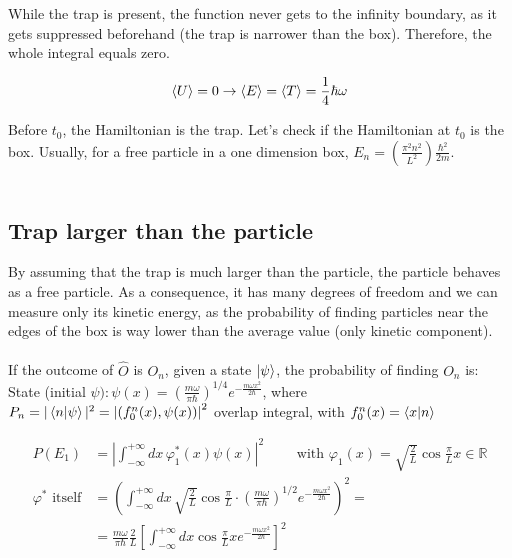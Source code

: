 \noindent
While the trap is present, the function never gets to the infinity boundary, as it gets suppressed beforehand (the trap is narrower than the box).
Therefore, the whole integral equals zero.

$$\expval{U}=0 \rightarrow \expval{E}=\expval{T}=\frac{1}{4} \hbar \omega $$

\noindent
Before $t_0$, the Hamiltonian is the trap.
Let's check if the Hamiltonian at $t_0$ is the box.
Usually, for a free particle in a one dimension box,  $E_n=\left(\frac{\pi^{2}n^2}{L^2}\right)\frac{\hbar^{2}}{2 m}$.\\
\\

	\subsection{Trap larger than the particle}
	By assuming that the trap is much larger than the particle, the particle behaves as a free particle.
	As a consequence, it has many degrees of freedom and we can measure only its kinetic energy, as the probability of finding particles near the edges of the box is way lower than the average value (only kinetic component).\\
	\\
	\noindent
	If the outcome of $\hat{O}$ is $O_n$, given a state $\ket{\psi}$, the probability of finding $O_n$ is:
	\\
	State (initial $\psi): \psi(x)=\left(\frac{m \omega}{ \pi \hbar}\right)^{1 / 4} e^{-\frac{m \omega x^{2}}{2 \hbar}}$, where $P_{n}=|\bra{n} \ket{\psi}|^{2}=\left|\left(f_{0}^{n}(x), \psi(x)\right)\right|^{2}$ overlap integral, with $f_{0}^{n}(x)=\bra{x}\ket{n}$

	\begin{align*}
		P\left(E_{1}\right)&=\left|\int_{-\infty}^{+\infty} d x\, \varphi_{1}^{*}(x) \psi(x)\right|^{2}\qquad \text{ with }\varphi_{1}(x)=\sqrt{\frac{2}{L}} \cos \frac{\pi}{L}x \in \mathbb{R}\\
		\varphi^{*} \text{ itself}&	=\left(\int_{-\infty}^{+\infty} d x\,\sqrt{\frac{2}{L}} \cos \frac{\pi}{L} \cdot \left(\frac{m \omega}{ \pi \hbar}\right)^{1 / 2} e^{-\frac{m \omega x^{2}}{2 \hbar}}\right)^{2}=\\
															&=\frac{m \omega}{ \pi \hbar}\frac{2}{L} \left[\int_{-\infty}^{+\infty} d x \cos \frac{\pi}{L} x e^{-\frac{m \omega x^{2}}{2 \hbar}}\right]^{2}
	\end{align*}

	\noindent

